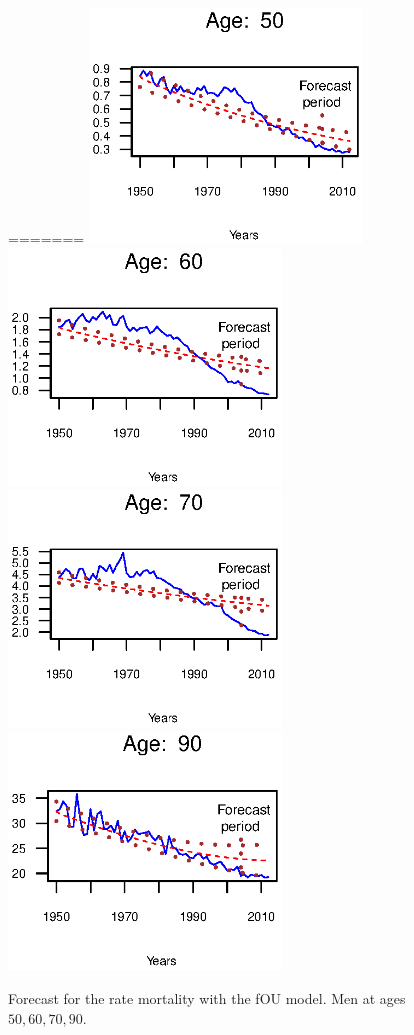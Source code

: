\documentclass[smallextended]{svjour3}
\begin{document}
\begin{figure}[H]

    \caption{Forecast for the rate mortality with the fOU model. Men at ages
    $50,60,70,90$.}
=======
    \includegraphics[width = 2.85in]{PlotMenForecast50.eps}
    \includegraphics[width = 2.85in]{PlotMenForecast60.eps}
    \includegraphics[width = 2.85in]{PlotMenForecast70.eps}
    \includegraphics[width = 2.85in]{PlotMenForecast90.eps}

\end{figure}
\end{document}
